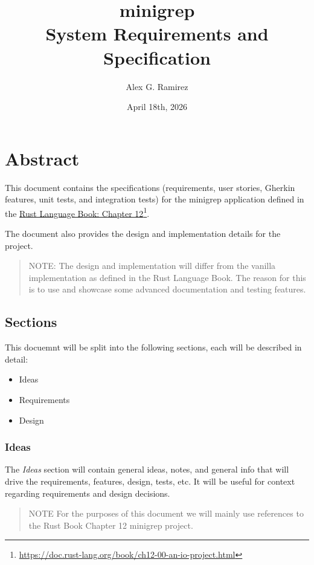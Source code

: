 \documentclass{book}
\title{minigrep \\ \large{System Requirements and Specification}}
\author{Alex G. Ramirez}
\date{April 18th, 2026}
\begin{document}
\maketitle
\tableofcontents

\chapter{Abstract}

This document contains the specifications (requirements, user stories, Gherkin 
features, unit tests, and integration tests) for the minigrep application defined
in the \href{https://doc.rust-lang.org/book/ch12-00-an-io-project.html}
{Rust Language Book: Chapter 12}\footnote{\url{https://doc.rust-lang.org/book/ch12-00-an-io-project.html}}.

The document also provides the design and implementation details for the project.
\begin{quotation}
    NOTE: The design and implementation will differ from the vanilla implementation
    as defined in the Rust Language Book.  The reason for this is to use and showcase
    some advanced documentation and testing features.
\end{quotation}

\section{Sections}

This docuemnt will be split into the following sections, each will be described in
detail:

\begin{itemize}
    \item Ideas
    \item Requirements
    \item Design
\end{itemize}

\subsection{Ideas}
The \emph{Ideas} section will contain general ideas, notes, and general info that
will drive the requirements, features, design, tests, etc.  It will be useful for
context regarding requirements and design decisions.

\begin{quotation}
    NOTE\: For the purposes of this document we will mainly use references to the
    Rust Book Chapter 12 minigrep project.
\end{quotation}
\end{document}
